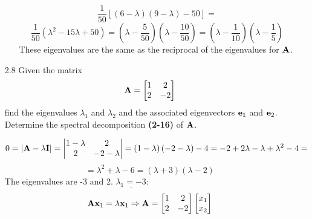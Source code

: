 \begin{enumerate}[font=\bfseries]
\begin{enumerate}
\[                \frac{1}{50} \left[\left(6 - \lambda\right)\left(9 - \lambda\right) - 50\right] =
            \]
            \[
                \frac{1}{50} \left(\lambda^2 - 15\lambda + 50\right) =
                \left(\lambda - \frac{5}{50}\right)\left(\lambda - \frac{10}{50}\right) =
                \left(\lambda - \frac{1}{10}\right)\left(\lambda - \frac{1}{5}\right)
            \]
            These eigenvalues are the same as the reciprocal of the eigenvalues for $\bold{A}$.
        \end{enumerate}
        \item[2.8] Given the matrix
        \[
            \bold{A} = \begin{bmatrix}
                1 & 2 \\
                2 & -2
            \end{bmatrix}
        \]
        find the eigenvalues $\lambda_1$ and $\lambda_2$ and the associated eigenvectors $\bold{e}_1$ and $\bold{e}_2$. Determine the spectral decomposition \textbf{(2-16)} of $\bold{A}$.
        \par
        \[
            0 = \left|\bold{A} - \lambda\bold{I}\right|
            =
            \left|
            \begin{matrix}
                1 - \lambda & 2 \\
                2 & -2 - \lambda
            \end{matrix}
            \right|
            =
            \left(1 - \lambda\right)\left(-2-\lambda\right) - 4
            =
            -2 + 2\lambda - \lambda + \lambda^2 - 4
            =
        \]
        \[
            = \lambda^2 + \lambda - 6
            = \left(\lambda + 3 \right)\left(\lambda - 2\right)
        \]
        The eigenvalues are -3 and 2.
        \newline
        $\underline{\lambda_1 = -3}$:
        \[
            \bold{A}\bold{x}_1 = \lambda\bold{x}_1
            \Rightarrow
            \bold{A} = \begin{bmatrix}
                1 & 2 \\
                2 & -2
            \end{bmatrix}
            \begin{bmatrix}
                x_1 \\
                x_2
            \end{bmatrix}
\]
\end{enumerate}
